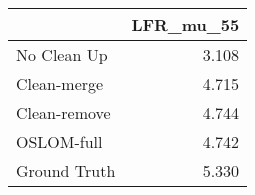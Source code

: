 \begin{tabular}{lr}
\toprule
{} & LFR_mu_55 \\
\midrule
No Clean Up  &     3.108 \\
Clean-merge  &     4.715 \\
Clean-remove &     4.744 \\
OSLOM-full   &     4.742 \\
Ground Truth &     5.330 \\
\bottomrule
\end{tabular}
